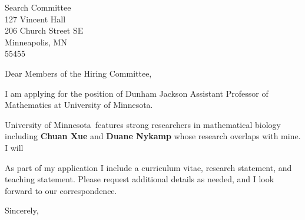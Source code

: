 \documentclass[11pt,a4paper]{letter}
\begin{document}
\def\School{University of Minnesota}
\begin{letter}
{Search Committee\\
127 Vincent Hall\\
206 Church Street SE\\
Minneapolis, MN\\
55455}


\opening{Dear Members of the Hiring Committee,}

I am applying for the position of Dunham Jackson Assistant Professor of Mathematics at \School. 



\School~features strong researchers in mathematical biology including \textbf{Chuan Xue} and \textbf{Duane Nykamp} whose research overlaps with mine. I will 



As part of my application I include a curriculum vitae, research statement, and teaching statement. Please request additional details as needed, and I look forward to our correspondence.

\closing{Sincerely,}
\end{letter}
\end{document}
